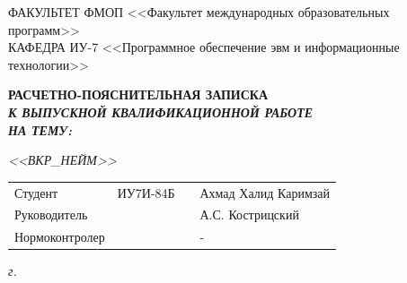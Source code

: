 \begin{titlepage}
	{
		\small \raggedright
		ФАКУЛЬТЕТ ФМОП <<Факультет международных образовательных программ>> \\
		\vspace{3.3mm}
		КАФЕДРА ИУ-7 <<Программное обеспечение эвм и информационные технологии>> \\
	}
	
	\vspace{20.8mm}
	
	{
		\LARGE \bfseries
		РАСЧЕТНО-ПОЯСНИТЕЛЬНАЯ ЗАПИСКА \\
	}
	\vspace{5mm}
	{
		\Large \bfseries \itshape
		К ВЫПУСКНОЙ КВАЛИФИКАЦИОННОЙ РАБОТЕ \\
		\vspace{5mm}
		НА ТЕМУ: \\
	}
	
	{
		\Large \itshape
		<<ВКР\_НЕЙМ>>
	}
	
	\vfill
	
	\begin{tabular}{p{}PPT}
		Студент &  ИУ7И-84Б & \uline{} & Ахмад Халид Каримзай \\
		Руководитель & ~ &  \uline{} & А.С. Кострицский \\
		Нормоконтролер & ~ &  \uline{} & - \\
	\end{tabular}
	
	\vspace{14mm}
	
	\textit{{\the\year} г.}
	
\end{titlepage}